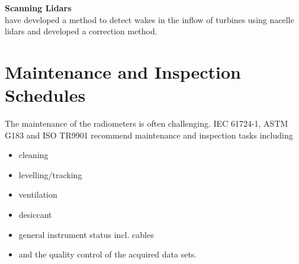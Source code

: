 \textbf{Scanning Lidars}\\
\cite{Held2019} have developed a method to detect wakes in the inflow of turbines using nacelle lidars and developed a correction method. 



 
\section{Maintenance and Inspection Schedules }\label{sec:maintenance-schedules}
The maintenance of the radiometers is often challenging. IEC 61724-1, ASTM G183 and ISO TR9901 recommend maintenance and inspection tasks including
\begin{itemize}
    \vspace{-0.2cm}\item cleaning
    \vspace{-0.4cm}\item levelling/tracking
    \vspace{-0.4cm}\item ventilation 
    \vspace{-0.4cm}\item desiccant
    \vspace{-0.4cm}\item general instrument status incl. cables
    \vspace{-0.4cm}\item and the quality control of the acquired data sets. 
\end{itemize}

